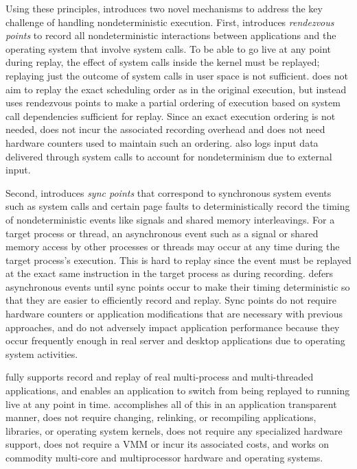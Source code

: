 Using these principles, \scribe{} introduces two novel mechanisms to
address the key challenge of 
handling nondeterministic execution.
First, \scribe{} introduces {\em rendezvous points} to record all
nondeterministic interactions between applications and the operating
system that involve system calls.  To be able to go live at any point
during replay, the effect of system calls inside the kernel must be
replayed; replaying just the outcome of system calls in user space is
not sufficient.  \scribe{} does not aim to replay
the exact scheduling order as in the original execution, but instead
uses rendezvous points to make a partial ordering of execution
based on system call dependencies sufficient for replay.  Since an
exact execution ordering is not needed, \scribe{} does not incur the
associated recording overhead and does not need hardware counters used
to maintain such an ordering.  \scribe{} also logs input data
delivered through system calls to account for nondeterminism due to
external input. 

Second, \scribe{} introduces {\em sync points} that correspond to
synchronous system events such as system calls and certain page faults 
to deterministically record the timing of nondeterministic events like
signals and shared memory interleavings.  For a target process or
thread, an asynchronous event such as a signal or shared memory access
by other processes or threads may occur at any time during the target
process's execution.  This is hard to replay since the event
must be replayed at the exact same instruction in the target process 
as during recording.  \scribe{} defers asynchronous events until sync
points occur to make their timing deterministic so that they are 
easier to efficiently record and replay.  Sync points do not require
hardware counters or application modifications that are necessary with
previous approaches, and do not adversely impact application
performance because they occur frequently enough in real server and
desktop applications due to operating system activities.   

\scribe{} fully supports record and replay of real multi-process
and multi-threaded applications, and  
enables an application to switch from being replayed to
running live at any point in time.
\scribe{} accomplishes all of this in an application transparent
manner, does not require changing, relinking, or recompiling
applications, libraries, or operating system kernels, does not require
any specialized hardware support, does not require a VMM or incur its
associated costs, and works on commodity multi-core and multiprocessor
hardware and operating systems.

